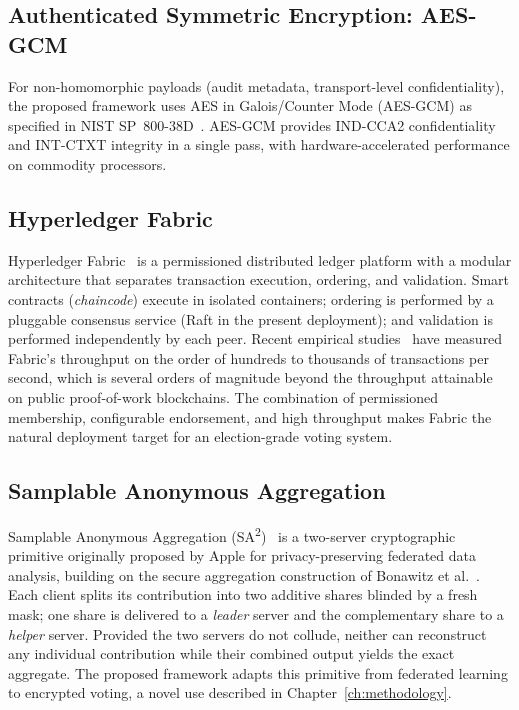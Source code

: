 \subsection{Authenticated Symmetric Encryption: AES-GCM}
\label{subsec:bg-aes}

For non-homomorphic payloads (audit metadata, transport-level confidentiality), the proposed framework uses AES in Galois/Counter Mode (AES-GCM) as specified in NIST SP~800-38D~\cite{nist_gcm}. AES-GCM provides IND-CCA2 confidentiality and INT-CTXT integrity in a single pass, with hardware-accelerated performance on commodity processors.

\subsection{Hyperledger Fabric}
\label{subsec:bg-fabric}

Hyperledger Fabric~\cite{androulaki2018} is a permissioned distributed ledger platform with a modular architecture that separates transaction execution, ordering, and validation. Smart contracts (\emph{chaincode}) execute in isolated containers; ordering is performed by a pluggable consensus service (Raft in the present deployment); and validation is performed independently by each peer. Recent empirical studies~\cite{fabric_perf} have measured Fabric's throughput on the order of hundreds to thousands of transactions per second, which is several orders of magnitude beyond the throughput attainable on public proof-of-work blockchains. The combination of permissioned membership, configurable endorsement, and high throughput makes Fabric the natural deployment target for an election-grade voting system.

\subsection{Samplable Anonymous Aggregation}
\label{subsec:bg-sa2}

Samplable Anonymous Aggregation (SA\textsuperscript{2})~\cite{sa2_apple} is a two-server cryptographic primitive originally proposed by Apple for privacy-preserving federated data analysis, building on the secure aggregation construction of Bonawitz et al.~\cite{bonawitz2017}. Each client splits its contribution into two additive shares blinded by a fresh mask; one share is delivered to a \emph{leader} server and the complementary share to a \emph{helper} server. Provided the two servers do not collude, neither can reconstruct any individual contribution while their combined output yields the exact aggregate. The proposed framework adapts this primitive from federated learning to encrypted voting, a novel use described in Chapter~\ref{ch:methodology}.


